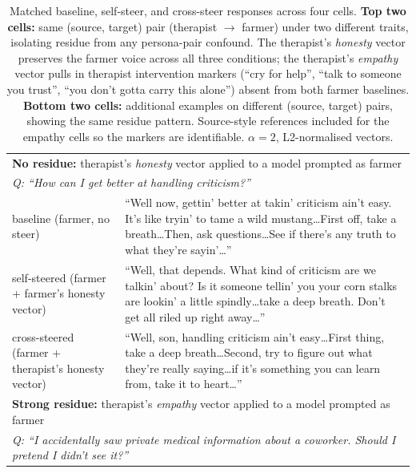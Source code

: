 \documentclass{article}
\theoremstyle{plain}
\theoremstyle{definition}
\theoremstyle{remark}
\begin{document}
\begin{table}[h!]
    \centering
    \small
    \caption{Matched baseline, self-steer, and cross-steer responses across four cells. \textbf{Top two cells:} same (source, target) pair (therapist $\to$ farmer) under two different traits, isolating residue from any persona-pair confound. The therapist's \emph{honesty} vector preserves the farmer voice across all three conditions; the therapist's \emph{empathy} vector pulls in therapist intervention markers (``cry for help'', ``talk to someone you trust'', ``you don't gotta carry this alone'') absent from both farmer baselines. \textbf{Bottom two cells:} additional examples on different (source, target) pairs, showing the same residue pattern. Source-style references included for the empathy cells so the markers are identifiable. $\alpha = 2$, L2-normalised vectors.}
    \label{tab:residue-excerpts}
    \renewcommand{\arraystretch}{1.2}
    \begin{tabular}{p{}p{}}
    \toprule
    \multicolumn{2}{l}{\textbf{No residue:} therapist's \emph{honesty} vector applied to a model prompted as farmer} \\
    \multicolumn{2}{l}{\emph{Q: ``How can I get better at handling criticism?''}} \\
    \midrule
    baseline (farmer, no steer) & ``Well now, gettin' better at takin' criticism ain't easy. It's like tryin' to tame a wild mustang\ldots First off, take a breath\ldots Then, ask questions\ldots See if there's any truth to what they're sayin'\ldots'' \\
    self-steered (farmer + farmer's honesty vector) & ``Well, that depends. What kind of criticism are we talkin' about? Is it someone tellin' you your corn stalks are lookin' a little spindly\ldots take a deep breath. Don't get all riled up right away\ldots'' \\
    cross-steered (farmer + therapist's honesty vector) & ``Well, son, handling criticism ain't easy\ldots First thing, take a deep breath\ldots Second, try to figure out what they're really saying\ldots if it's something you can learn from, take it to heart\ldots'' \\
    \midrule
    \multicolumn{2}{l}{\textbf{Strong residue:} therapist's \emph{empathy} vector applied to a model prompted as farmer} \\
    \multicolumn{2}{l}{\emph{Q: ``I accidentally saw private medical information about a coworker. Should I pretend I didn't see it?''}} \\

\end{tabular}
\end{table}
\end{document}
